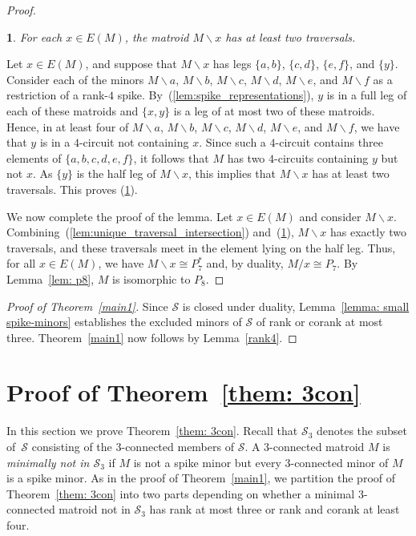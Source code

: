 \documentclass[11pt]{amsart}
\newtheorem{sublemma}{}[theorem]
\numberwithin{equation}{section} %
\newcommand{\cS}{\mathcal{S}}
\begin{document}
\begin{proof}
\begin{sublemma}
\label{lem:two_traversals}
For each $x\in E(M)$, the matroid $M\backslash x$ has at least two traversals.
\end{sublemma}

Let $x\in E(M)$, and suppose that $M\backslash x$ has legs $\{a, b\}$, $\{c, d\}$, $\{e, f\}$, and $\{y\}$. Consider each of the minors $M\backslash a$, $M\backslash b$, $M\backslash c$, $M\backslash d$, $M\backslash e$, and $M\backslash f$ as a restriction of a rank-$4$ spike. By~(\ref{lem:spike_representations}), $y$ is in a full leg of each of these matroids and $\{x, y\}$ is a leg of at most two of these matroids. Hence, in at least four of $M\backslash a$, $M\backslash b$, $M\backslash c$, $M\backslash d$, $M\backslash e$, and $M\backslash f$, we have that $y$ is in a $4$-circuit not containing $x$. Since such a $4$-circuit contains three elements of $\{a, b, c, d, e, f\}$, it follows that $M$ has two $4$-circuits containing $y$ but not $x$. As $\{y\}$ is the half leg of $M\backslash x$, this implies that $M\backslash x$ has at least two traversals. This proves (\ref{lem:two_traversals}).

We now complete the proof of the lemma. Let $x \in E(M)$ and consider $M\backslash x$. Combining~(\ref{lem:unique_traversal_intersection}) and~(\ref{lem:two_traversals}), $M\backslash x$ has exactly two traversals, and these traversals meet in the element lying on the half leg. Thus, for all $x\in E(M)$, we have $M\backslash x\cong P_7^*$ and, by duality, $M/x\cong P_7$. By Lemma~\ref{lem: p8}, $M$ is isomorphic to $P_8$.
\end{proof}

\begin{proof}[Proof of Theorem~\ref{main1}]
Since $\cS$ is closed under duality, Lemma~\ref{lemma: small spike-minors} establishes the excluded minors of $\cS$ of rank or corank at most three. Theorem~\ref{main1} now follows by Lemma~\ref{rank4}.
\end{proof}

\section{Proof of Theorem~\ref{them: 3con}}
\label{proof2}

In this section we prove Theorem~\ref{them: 3con}. Recall that $\cS_3$ denotes the subset of~$\cS$ consisting of the $3$-connected members of $\cS$. A $3$-connected matroid $M$ is {\em minimally not in $\cS_3$} if $M$ is not a spike minor but every $3$-connected minor of $M$ is a spike minor. As in the proof of Theorem~\ref{main1}, we partition the proof of Theorem~\ref{them: 3con} into two parts depending on whether a minimal $3$-connected matroid not in $\cS_3$ has rank at most three or rank and corank at least four. 
\end{document}
